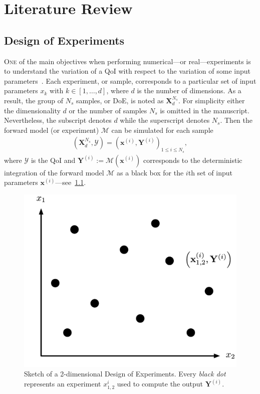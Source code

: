 \chapter{Literature Review}\label{chap:review}

\section{Design of Experiments}\label{sec:doe}

\lettrine{O}{ne} of the main objectives when performing numerical---or real---experiments is to understand the variation of a QoI with respect to the variation of some input parameters~\citep{Sacks1989}. Each experiment, or sample, corresponds to a particular set of input parameters $x_k$ with $k \in [1, \dots , d]$, where $d$ is the number of dimensions. As a result, the group of $N_s$ samples, or DoE, is noted as $\mathbf{X}^{N_s}_d$. For simplicity either the dimensionality $d$ or the number of samples $N_s$ is omitted in the manuscript. Nevertheless, the subscript denotes $d$ while the superscript denotes $N_s$. Then the forward model (or experiment) $\mathcal{M}$ can be simulated for each sample
\begin{align}
(\mathbf{X}^{N_s}_d, \mathcal{Y})=\left(\mathbf{x}^{(i)},\mathbf{Y}^{(i)}\right)_{1\leq i\leq N_{s}},
\end{align}
\noindent where $\mathcal{Y}$ is the QoI and $\mathbf{Y}^{(i)} := \mathcal{M}(\mathbf{x}^{(i)})$ corresponds to the deterministic integration of the forward model $\mathcal{M}$ as a black box for the $i$th set of input parameters $\mathbf{x}^{(i)}$---see~\cref{fig:doe}.

\begin{figure}[!ht]
\centering
\includegraphics[width=0.5\linewidth,keepaspectratio]{fig/literature/doe.pdf}
\caption{Sketch of a 2-dimensional Design of Experiments. Every \emph{black dot} represents an experiment $x_{1, 2}^i$ used to compute the output $\mathbf{Y}^{(i)}$.}
\label{fig:doe}
\end{figure}

